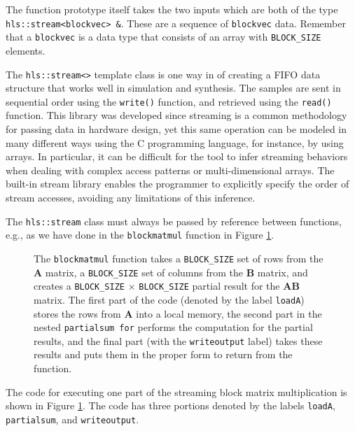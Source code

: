 The function prototype itself takes the two inputs which are both of the type \lstinline{hls::stream<blockvec> &}. These are a sequence of \lstinline{blockvec} data. Remember that a \lstinline{blockvec} is a data type that consists of an array with \lstinline{BLOCK_SIZE} elements. 

The \lstinline{hls::stream<>} template class is one way in \VHLS of creating a FIFO data structure that works well in simulation and synthesis. The samples are sent in sequential order using the \lstinline{write()} function, and retrieved using the \lstinline{read()} function. This library was developed since streaming is a common methodology for passing data in hardware design, yet this same operation can be modeled in many different ways using the C programming language, for instance, by using arrays. In particular, it can be difficult for the \VHLS tool to infer streaming behaviors when dealing with complex access patterns or multi-dimensional arrays. The built-in stream library enables the programmer to explicitly specify the order of stream accesses, avoiding any limitations of this inference. 

\begin{aside}
The \lstinline{hls::stream} class must always be passed by reference between functions, e.g., as we have done in the \lstinline{blockmatmul} function in Figure \ref{fig:block_mm}.
\end{aside}

\begin{figure}

\caption{  The \lstinline{blockmatmul} function takes a \lstinline{BLOCK_SIZE} set of rows from the $\mathbf{A}$ matrix, a \lstinline{BLOCK_SIZE} set of columns from the $\mathbf{B}$ matrix, and creates a \lstinline{BLOCK_SIZE} $\times$ \lstinline{BLOCK_SIZE} partial result for the $\mathbf{AB}$ matrix. The first part of the code (denoted by the label \lstinline{loadA}) stores the rows from $\mathbf{A}$ into a local memory, the second part in the nested \lstinline{partialsum for} performs the computation for the partial results, and the final part (with the \lstinline{writeoutput} label) takes these results and puts them in the proper form to return from the function.}
\label{fig:block_mm}
\end{figure}

The code for executing one part of the streaming block matrix multiplication is shown in Figure \ref{fig:block_mm}. The code has three portions denoted by the labels \lstinline{loadA}, \lstinline{partialsum}, and \lstinline{writeoutput}. 

